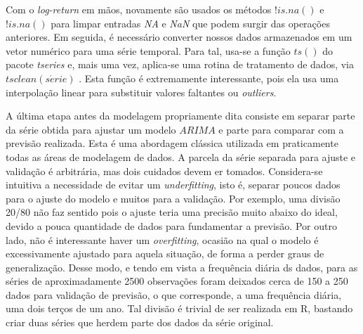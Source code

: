 \documentclass[12pt]{article}
\begin{document}
Com o \textit{log-return} em mãos, novamente são usados os métodos $!is.na()$ e $!is.na()$ para limpar entradas \textit{NA} e \textit{NaN} que podem surgir das operações anteriores. Em seguida, é necessário converter nossos dados armazenados em um vetor numérico para uma série temporal. Para tal, usa-se a função $ts()$ do pacote \emph{tseries} e, mais uma vez, aplica-se uma rotina de tratamento de dados, via $tsclean(s\acute{e}rie)$ \cite{CRANR}. Esta função é extremamente interessante, pois ela usa uma interpolação linear para substituir valores faltantes ou \textit{outliers}. 

A última etapa antes da modelagem propriamente dita consiste em separar parte da série obtida para ajustar um modelo $ARIMA$ e parte para comparar com a previsão realizada. Esta é uma abordagem clássica utilizada em praticamente todas as áreas de modelagem de dados. A parcela da série separada para ajuste e validação é arbitrária, mas dois cuidados devem er tomados. Considera-se intuitiva a necessidade de evitar um \textit{underfitting}, isto é, separar poucos dados para o ajuste do modelo e muitos para a validação. Por exemplo, uma divisão 20/80 não faz sentido pois o ajuste teria uma precisão muito abaixo do ideal, devido a pouca quantidade de dados para fundamentar a previsão. Por outro lado, não é interessante haver um \textit{overfitting}, ocasião na qual o modelo é excessivamente ajustado para aquela situação, de forma a perder graus de generalização. Desse modo, e tendo em vista a frequência diária ds dados, para as séries de aproximadamente 2500 observações foram deixados cerca de 150 a 250 dados para validação de previsão, o que corresponde, a uma frequência diária, uma dois terços de um ano. Tal divisão é trivial de ser realizada em R, bastando criar duas séries que herdem parte dos dados da série original.
\end{document}

